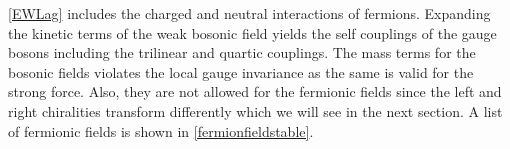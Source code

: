 \autoref{EWLag} includes the charged and neutral interactions of fermions. Expanding the kinetic terms of the weak bosonic field yields the self couplings of the gauge bosons including the trilinear and quartic couplings. The mass terms for the bosonic fields violates the local gauge invariance as the same is valid for the strong force. Also, they are not allowed for the fermionic fields since the left and right chiralities transform differently which we will see in the next section. A list of fermionic fields is shown in \autoref{fermionfieldstable}.

\begin{table*}[ht]
	{\setlength{\tabcolsep}{14pt}
		\caption{Fermion fields under $SU(2)_L$ group representation.}
		\begin{center}
			\vspace{-6mm}
\end{center}}
\end{table*}
